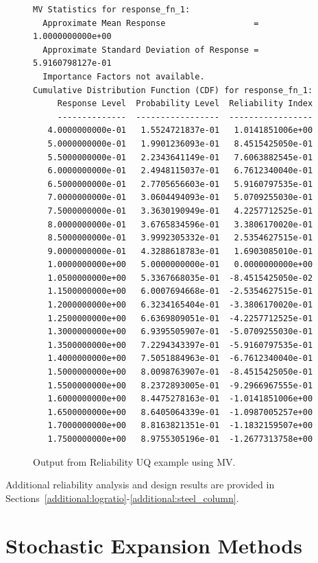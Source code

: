 \begin{figure} %
\begin{bigbox}
\begin{small}
\begin{verbatim}
MV Statistics for response_fn_1:
  Approximate Mean Response                  =  1.0000000000e+00
  Approximate Standard Deviation of Response =  5.9160798127e-01
  Importance Factors not available.
Cumulative Distribution Function (CDF) for response_fn_1:
     Response Level  Probability Level  Reliability Index
     --------------  -----------------  -----------------
   4.0000000000e-01   1.5524721837e-01   1.0141851006e+00
   5.0000000000e-01   1.9901236093e-01   8.4515425050e-01
   5.5000000000e-01   2.2343641149e-01   7.6063882545e-01
   6.0000000000e-01   2.4948115037e-01   6.7612340040e-01
   6.5000000000e-01   2.7705656603e-01   5.9160797535e-01
   7.0000000000e-01   3.0604494093e-01   5.0709255030e-01
   7.5000000000e-01   3.3630190949e-01   4.2257712525e-01
   8.0000000000e-01   3.6765834596e-01   3.3806170020e-01
   8.5000000000e-01   3.9992305332e-01   2.5354627515e-01
   9.0000000000e-01   4.3288618783e-01   1.6903085010e-01
   1.0000000000e+00   5.0000000000e-01   0.0000000000e+00
   1.0500000000e+00   5.3367668035e-01  -8.4515425050e-02
   1.1500000000e+00   6.0007694668e-01  -2.5354627515e-01
   1.2000000000e+00   6.3234165404e-01  -3.3806170020e-01
   1.2500000000e+00   6.6369809051e-01  -4.2257712525e-01
   1.3000000000e+00   6.9395505907e-01  -5.0709255030e-01
   1.3500000000e+00   7.2294343397e-01  -5.9160797535e-01
   1.4000000000e+00   7.5051884963e-01  -6.7612340040e-01
   1.5000000000e+00   8.0098763907e-01  -8.4515425050e-01
   1.5500000000e+00   8.2372893005e-01  -9.2966967555e-01
   1.6000000000e+00   8.4475278163e-01  -1.0141851006e+00
   1.6500000000e+00   8.6405064339e-01  -1.0987005257e+00
   1.7000000000e+00   8.8163821351e-01  -1.1832159507e+00
   1.7500000000e+00   8.9755305196e-01  -1.2677313758e+00
\end{verbatim}
\end{small}
\end{bigbox}
\caption{Output from Reliability UQ example using MV.}
\label{uq:rel_output_mv}
\end{figure}

Additional reliability analysis and design results are provided in 
Sections~\ref{additional:logratio}-\ref{additional:steel_column}.


\section{Stochastic Expansion Methods}\label{uq:expansion}


